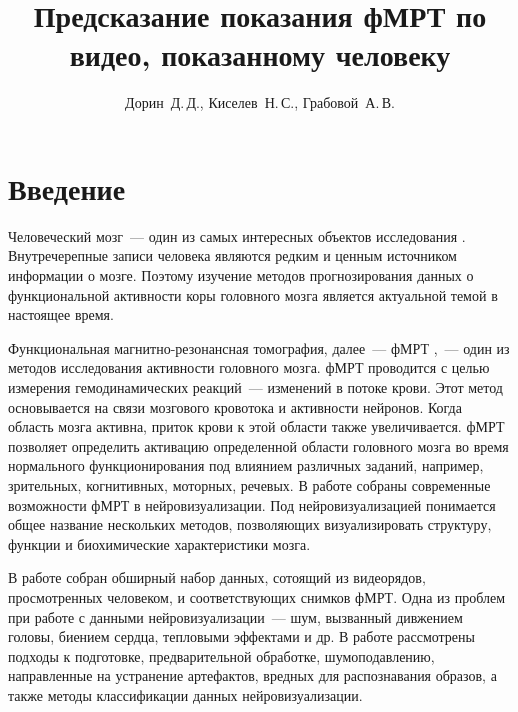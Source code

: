 \documentclass[12pt,twoside]{article}
\title
    [Предсказание показания фМРТ по видео, показанному человеку] %
    {Предсказание показания фМРТ по видео, показанному человеку}
\author
    [Дорин~Д.\,Д.] %
    {Дорин~Д.\,Д., Киселев~Н.\,С., Грабовой~А.\,В.} %
    [Дорин~Д.\,Д.$^{1,2}$, Грабовой~А.\,В.$^2$] %
\begin{document}
\maketitle
\section{Введение}
Человеческий мозг~--- один из самых интересных объектов исследования \citep{Zhumakova}. 
Внутречерепные записи человека являются редким и ценным источником информации о мозге.
Поэтому изучение методов прогнозирования данных о функциональной активности коры головного мозга является актуальной темой в настоящее время.

Функциональная магнитно-резонансная томография, далее~--- фМРТ \citep{Ushakov},~--- один из методов исследования активности головного мозга.
фМРТ проводится с целью измерения гемодинамических реакций~--- изменений в потоке крови. 
Этот метод основывается на связи мозгового кровотока и активности нейронов. Когда область мозга активна, 
приток крови к этой области также увеличивается. 
фМРТ позволяет определить активацию определенной области головного мозга во время нормального функционирования под 
влиянием различных заданий, например, зрительных, когнитивных,  моторных,  речевых.
В работе \citep{Belyaevskaya2018} собраны современные возможности фМРТ в нейровизуализации. 
Под нейровизуализацией понимается общее название нескольких методов, позволяющих визуализировать структуру, функции и биохимические характеристики мозга.

В работе \citep{Berezutskaya2022} собран обширный набор данных, сотоящий из видеорядов, просмотренных 
человеком, и соответствующих снимков фМРТ. Одна из проблем при работе с данными нейровизуализации~--- шум, вызванный 
дивжением головы, биением сердца, тепловыми эффектами и др. 
В работе \citep{https://doi.org/10.48550/arxiv.1804.10167} рассмотрены подходы к подготовке,
предварительной обработке, шумоподавлению, направленные на устранение артефактов, вредных 
для распознавания образов, а также методы классификации данных нейровизуализации.
\end{document}
